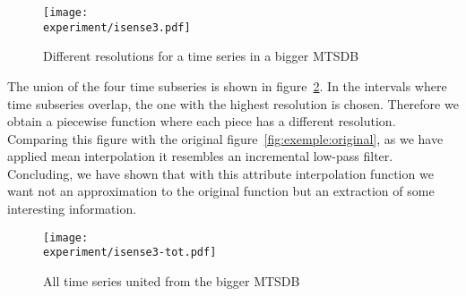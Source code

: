\begin{figure}[tp]
\centering
\texttt{[image: \\experiment/isense3.pdf]}
\caption{Different resolutions for a time series in a bigger MTSDB}
\label{fig:exemple:4mrdbigger}
\end{figure}




The union of the four time subseries is shown in
figure~\ref{fig:exemple:4mrdtot}. In the intervals where time
subseries overlap, the one with the highest resolution is
chosen. Therefore we obtain a piecewise function where each piece has
a different resolution. Comparing this figure with the original
figure~\ref{fig:exemple:original}, as we have applied mean
interpolation it resembles an incremental low-pass filter. Concluding,
we have shown that with this attribute interpolation function we want
not an approximation to the original function but an extraction of
some interesting information.



\begin{figure}[tp]
\centering
\texttt{[image: \\experiment/isense3-tot.pdf]}
\caption{All time series united from the bigger MTSDB}
\label{fig:exemple:4mrdtot}
\end{figure}




